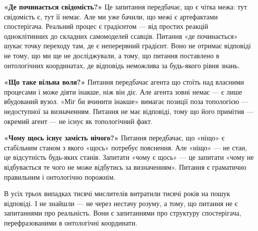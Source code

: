 \documentclass[12pt, a4paper, openany]{book}
\begin{document}
\textbf{«Де починається свідомість?»} Це запитання передбачає, що є чітка межа: тут свідомість є, тут її немає. Але ми уже бачили, що межі є артефактами спостерігача. Реальний процес є градієнтом — від простих реакцій одноклітинних до складних самомоделей ссавців. Питання «де починається» шукає точку переходу там, де є неперервний градієнт. Воно не отримає відповіді не тому, що ми ще не досліджували, а тому, що питання поставлено в онтологічних координатах, де відповідь неможлива за будь-якого рівня знань.

\textbf{«Що таке вільна воля?»} Питання передбачає агента що стоїть над власними процесами і може діяти інакше, ніж він діє. Але агента зовні немає — є лише вбудований вузол. «Міг би вчинити інакше» вимагає позиції поза топологією — недоступної за визначенням. Питання не має відповіді, тому що його примітив — окремий агент — не існує як топологічний факт.

\textbf{«Чому щось існує замість нічого?»} Питання передбачає, що «ніщо» є стабільним станом з якого «щось» потребує пояснення. Але «ніщо» — не стан, це відсутність будь-яких станів. Запитати «чому є щось» — це запитати «чому не відбувається те чого не може відбутись за визначенням». Питання є граматично правильним і онтологічно порожнім.

В усіх трьох випадках тисячі мислителів витратили тисячі років на пошук відповіді. І не знайшли — не через нестачу розуму, а тому, що питання не є запитаннями про реальність. Вони є запитаннями про структуру спостерігача, перефразованими в онтологічні координати.
\end{document}

